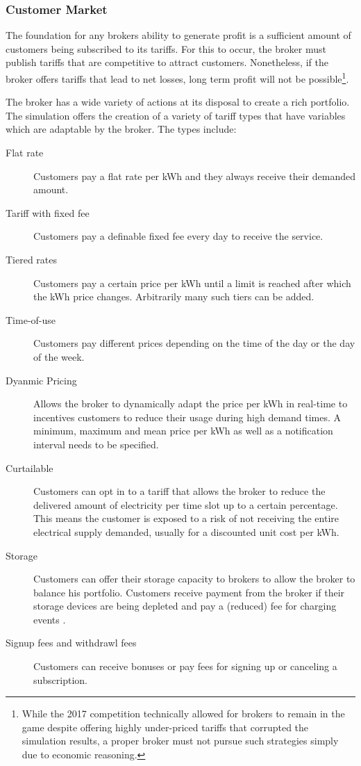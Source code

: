 \subsubsection{Customer Market}

The foundation for any brokers ability to generate profit is a sufficient amount of customers being subscribed to its tariffs. For
this to occur, the broker must publish tariffs that are competitive to attract customers. Nonetheless, if the
broker offers tariffs that lead to net losses, long term profit will not be possible\footnote{While the 2017
    competition technically allowed for brokers to remain in the game despite offering highly under-priced tariffs that
    corrupted the simulation results, a proper broker must not pursue such strategies simply due to economic
reasoning.}.

The broker has a wide variety of actions at its disposal to create a rich portfolio. The simulation offers the
creation of a variety of tariff types that have variables which are adaptable by the broker. The types include:

\begin{description}
    \item[Flat rate] Customers pay a flat rate per kWh and they always receive their demanded
        amount.
    \item[Tariff with fixed fee] Customers pay a definable fixed fee every day to receive the service.
    \item [Tiered rates] Customers pay a certain price per kWh until a limit is reached after which the kWh price
        changes.  Arbitrarily many such tiers can be added.  \item[Time-of-use] Customers pay different prices depending
        on the time of the day or the day of the week.  \item[Dyanmic Pricing] Allows the broker to dynamically adapt
        the price per kWh in real-time to incentives customers to reduce their usage during high demand times. A
        minimum, maximum and mean price per kWh as well as a notification interval needs to be specified.
    \item[Curtailable] Customers can opt in to a tariff that allows the broker to reduce the delivered amount of
        electricity per time slot up to a certain percentage. This means the customer is exposed to a risk of not
        receiving the entire electrical supply demanded, usually for a discounted unit cost per kWh.  \item[Storage]
        Customers can offer their storage capacity to brokers to allow the broker to balance his portfolio. Customers
        receive payment from the broker if their storage devices are being depleted and pay a (reduced) fee for charging
        events \citep[p.9]{ketter2018powertac}.
    \item[Signup fees and withdrawl fees] Customers can receive bonuses or pay fees
        for signing up or canceling a subscription.
\end{description}

